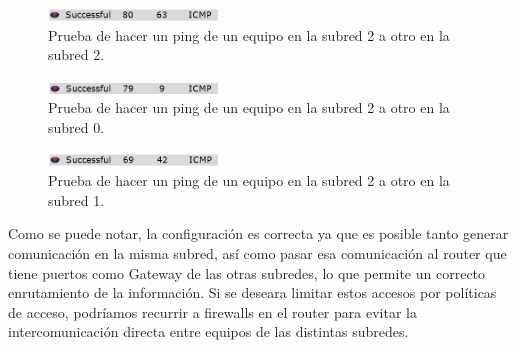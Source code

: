 \documentclass[../main.tex]{subfiles}
\begin{document}
\begin{figure}[H]
  \centering
  \includegraphics[width=0.4\textwidth]{images/test7.PNG}
  \caption{Prueba de hacer un ping de un equipo en la subred 2 a otro en la subred 2.}\label{fig:t7}
\end{figure}

\begin{figure}[H]
  \centering
  \includegraphics[width=0.4\textwidth]{images/test8.PNG}
  \caption{Prueba de hacer un ping de un equipo en la subred 2 a otro en la subred 0.}\label{fig:t8}
\end{figure}

\begin{figure}[H]
  \centering
  \includegraphics[width=0.4\textwidth]{images/test9.PNG}
  \caption{Prueba de hacer un ping de un equipo en la subred 2 a otro en la subred 1.}\label{fig:t9}
\end{figure}

Como se puede notar, la configuración es correcta ya que es posible tanto generar comunicación en la misma subred, así como pasar esa comunicación al router que tiene puertos como Gateway de las otras subredes, lo que permite un correcto enrutamiento de la información. Si se deseara limitar estos accesos por políticas de acceso, podríamos recurrir a firewalls en el router para evitar la intercomunicación directa entre equipos de las distintas subredes.
\end{document}
